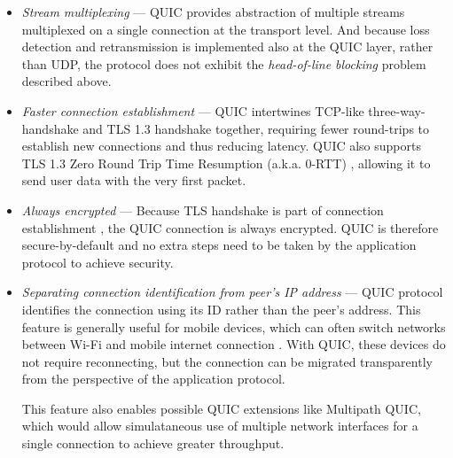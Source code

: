 \begin{itemize}
  \item \textit{Stream multiplexing} --- 
    QUIC provides abstraction of multiple streams multiplexed on a single connection at the
    transport level. And because loss detection and retransmission is implemented also at the QUIC
    layer, rather than UDP, the protocol does not exhibit the \textit{head-of-line blocking} problem
    described above.

  \item \textit{Faster connection establishment} ---
    QUIC intertwines TCP-like three-way-handshake and TLS 1.3 handshake together, requiring fewer
    round-trips to establish new connections and thus reducing latency. QUIC also supports TLS 1.3
    Zero Round Trip Time Resumption (a.k.a. 0-RTT) , allowing it to send user data with the very first
    packet. 

  \item \textit{Always encrypted} ---
    Because TLS handshake is part of connection establishment , the QUIC connection is always
    encrypted. QUIC is therefore secure-by-default and no extra steps need to be taken by the
    application protocol to achieve security.

  \item \textit{Separating connection identification from peer's IP address} ---
    QUIC protocol identifies the connection using its ID  rather than the peer's address. This
    feature is generally useful for mobile devices,  which can often switch networks between Wi-Fi and
    mobile internet connection . With QUIC, these devices do not require
    reconnecting, but the connection can be migrated transparently from the perspective of the application protocol.

    This feature also enables possible QUIC extensions like Multipath QUIC, which would allow
    simulataneous use of multiple network interfaces for a single connection to achieve greater
    throughput. 

\end{itemize}

